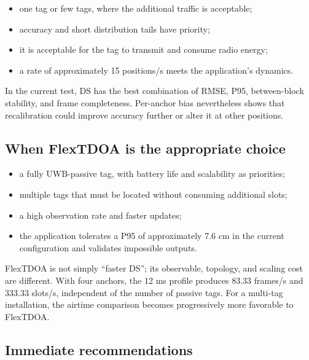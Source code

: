 \documentclass[11pt,a4paper]{article}
\begin{document}
\begin{itemize}[leftmargin=6mm]
  \item one tag or few tags, where the additional traffic is acceptable;
  \item accuracy and short distribution tails have priority;
  \item it is acceptable for the tag to transmit and consume radio energy;
  \item a rate of approximately 15 positions/s meets the application's
  dynamics.
\end{itemize}

In the current test, DS has the best combination of RMSE, P95, between-block
stability, and frame completeness. Per-anchor bias nevertheless shows that
recalibration could improve accuracy further or alter it at other positions.

\subsection{When FlexTDOA is the appropriate choice}

\begin{itemize}[leftmargin=6mm]
  \item a fully UWB-passive tag, with battery life and scalability as
  priorities;
  \item multiple tags that must be located without consuming additional
  slots;
  \item a high observation rate and faster updates;
  \item the application tolerates a P95 of approximately 7.6 cm in the current
  configuration and validates impossible outputs.
\end{itemize}

FlexTDOA is not simply ``faster DS''; its observable, topology, and scaling
cost are different. With four anchors, the 12 ms profile produces
83.33 frames/s and 333.33 slots/s, independent of the number of passive tags.
For a multi-tag installation, the airtime comparison becomes progressively
more favorable to FlexTDOA.

\subsection{Immediate recommendations}
\end{document}
